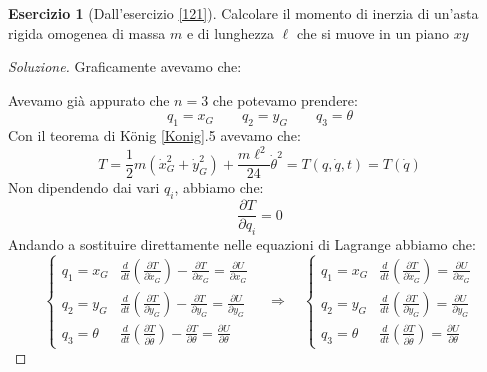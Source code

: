 \documentclass[11pt,a4paper,twoside]{article}
\theoremstyle{definition}
\newtheorem{ese}{Esercizio}[section]
\newenvironment{sol}
	{\renewcommand\qedsymbol{$\blacksquare$}\begin{proof}[Soluzione]}
	{\end{proof}}
\begin{document}
\begin{ese}[Dall'esercizio \ref{121}]
		Calcolare il momento di inerzia di un'asta rigida omogenea di massa $m$ e di lunghezza $\ell$ che si muove in un piano $xy$
\end{ese}
\begin{sol}
	Graficamente avevamo che:
	\begin{center}
	\end{center}
	Avevamo già appurato che $n = 3$ che potevamo prendere:
	\[ q_1 = x_G \qquad q_2 = y_G \qquad q_3 = \theta \]
	Con il teorema di König \ref{Konig}.5 avevamo che:
	\[ T = \frac 12 m \left( \dot x^2_G + \dot y^2_G \right) + \frac{m\ell^2}{24} \dot \theta^2 = T(q, \dot q, t) = T(\dot q) \]
	Non dipendendo dai vari $q_i$, abbiamo che:
	\[ \frac{\partial T}{\partial q_i} = 0 \]
	Andando a sostituire direttamente nelle equazioni di Lagrange abbiamo che:
	\[\begin{cases}
		q_1=x_G & \frac{d}{dt} \left( \frac{\partial T}{\partial \dot x_G} \right) - \frac{\partial T}{\partial x_G} = \frac{\partial U}{\partial x_G}\\
		q_2=y_G & \frac{d}{dt} \left( \frac{\partial T}{\partial \dot y_G} \right) - \frac{\partial T}{\partial y_G} = \frac{\partial U}{\partial y_G}\\
		q_3=\theta & \frac{d}{dt} \left( \frac{\partial T}{\partial \dot \theta} \right) - \frac{\partial T}{\partial \theta} = \frac{\partial U}{\partial \theta}
	\end{cases} \quad \Rightarrow \quad \begin{cases}
		q_1=x_G & \frac{d}{dt} \left( \frac{\partial T}{\partial \dot x_G} \right) = \frac{\partial U}{\partial x_G}\\
		q_2=y_G & \frac{d}{dt} \left( \frac{\partial T}{\partial \dot y_G} \right)  = \frac{\partial U}{\partial y_G}\\
		q_3=\theta & \frac{d}{dt} \left( \frac{\partial T}{\partial \dot \theta} \right)  = \frac{\partial U}{\partial \theta}


\end{cases}\]
\end{sol}
\end{document}
